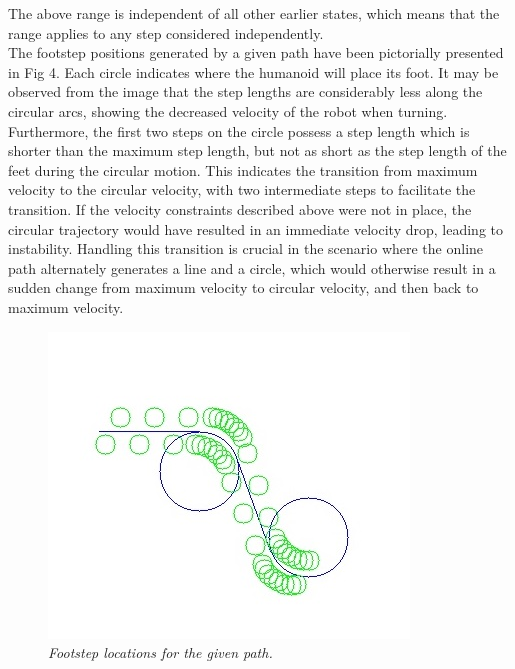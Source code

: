 \documentclass[letterpaper, 10 pt, conference]{ieeeconf}  %
\begin{document}
The above range is independent of all other earlier states, which means that the range applies to any step considered independently.\\
The footstep positions generated by a given path have been pictorially presented in Fig 4. Each circle indicates where the humanoid will place its foot. It may be observed from the image that the step lengths are considerably less along the circular arcs, showing the decreased velocity of the robot when turning. Furthermore, the first two steps on the circle possess a step length which is shorter than the maximum step length, but not as short as the step length of the feet during the circular motion. This indicates the transition from maximum velocity to the circular velocity, with two intermediate steps to facilitate the transition. If the velocity constraints described above were not in place, the circular trajectory would have resulted in an immediate velocity drop, leading to instability. Handling this transition is crucial in the scenario where the online path alternately generates a line and a circle, which would otherwise result in a sudden change from maximum velocity to circular velocity, and then back to maximum velocity.
\begin{figure}[h]  
\begin{center}  
\includegraphics[scale=0.8]{footstep.jpg}  
\caption{\small \sl Footstep locations for the given path.\label{fig:footstep}}  
\end{center}  
\end{figure}
\end{document}
